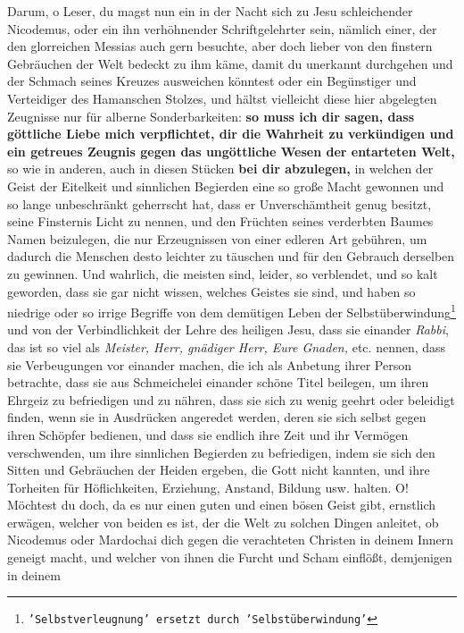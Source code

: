 Darum, o Leser, du magst nun ein in der Nacht sich zu Jesu schleichender
Nicodemus, oder ein ihn verhöhnender Schriftgelehrter
sein, nämlich einer, der
den glorreichen Messias auch gern besuchte, aber doch lieber von den finstern
Gebräuchen der Welt bedeckt zu ihm käme, damit du unerkannt durchgehen und der
Schmach seines Kreuzes ausweichen könntest oder ein Begünstiger und Verteidiger
des Hamanschen 
Stolzes, und hältst vielleicht diese hier abgelegten
Zeugnisse
nur für alberne Sonderbarkeiten: \textbf{so muss ich dir sagen, dass göttliche
Liebe mich
verpflichtet, dir die Wahrheit zu verkündigen und ein getreues
Zeugnis gegen das
ungöttliche Wesen der entarteten Welt,} so wie in anderen, auch in diesen
Stücken
\textbf{bei dir abzulegen,} in welchen der Geist der Eitelkeit und sinnlichen
Begierden
eine so große Macht gewonnen und so lange unbeschränkt geherrscht hat, dass er
Unverschämtheit genug besitzt, seine Finsternis Licht zu nennen, und den
Früchten seines verderbten Baumes Namen beizulegen, die nur Erzeugnissen von
einer edleren Art gebühren, um dadurch die Menschen desto leichter zu täuschen
und für den Gebrauch derselben zu gewinnen. Und wahrlich, die meisten sind,
leider, so verblendet, und so kalt geworden, dass sie gar nicht wissen,
welches Geistes sie sind, und haben so niedrige oder so irrige Begriffe von dem
demütigen Leben der Selbstüberwindung\footnote{\texttt{'Selbstverleugnung'
ersetzt durch 'Selbstüberwindung'}} und
von der Verbindlichkeit der Lehre des
heiligen Jesu, dass sie einander \textit{Rabbi}, das ist so viel als
\textit{Meister,
Herr, gnädiger Herr, Eure Gnaden,} etc. nennen, dass sie Verbeugungen vor
einander machen, die ich als Anbetung ihrer Person betrachte, dass sie aus
Schmeichelei einander schöne Titel beilegen, um ihren Ehrgeiz zu befriedigen und
zu nähren, dass sie sich zu wenig geehrt oder beleidigt finden, wenn sie in
Ausdrücken angeredet werden, deren sie sich selbst gegen ihren Schöpfer
bedienen, und dass sie endlich ihre Zeit und ihr Vermögen verschwenden, um ihre
sinnlichen Begierden zu befriedigen, indem sie sich den Sitten und Gebräuchen
der Heiden ergeben, die Gott nicht kannten, und ihre Torheiten für
Höflichkeiten, Erziehung, Anstand, Bildung usw. halten. O! Möchtest
du doch, da es nur einen guten und einen bösen Geist gibt, ernstlich erwägen,
welcher von beiden es ist, der die Welt zu solchen Dingen anleitet, ob Nicodemus
oder Mardochai dich gegen die verachteten Christen in
deinem Innern geneigt
macht, und welcher von ihnen die Furcht und Scham einflößt, demjenigen in deinem
